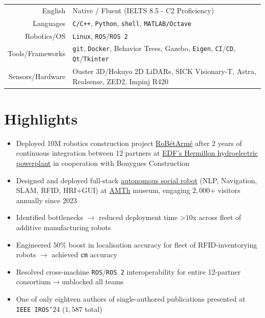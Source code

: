 \documentclass[a4paper,10pt,twoside]{article}
\begin{document}
\begin{center}
\begin{tabular}{rl}
English & Native / Fluent (IELTS 8.5 - C2 Proficiency) \\
Languages & \texttt{C/C++}, \texttt{Python}, \texttt{shell}, \texttt{MATLAB/Octave} \\
Robotics/OS & \texttt{Linux},  \texttt{ROS}/\texttt{ROS 2} \\
Tools/Frameworks & \texttt{git}, \texttt{Docker}, Behavior Trees, Gazebo, \texttt{Eigen}, \texttt{CI}/\texttt{CD}, \texttt{Qt}/\texttt{Tkinter} \\
Sensors/Hardware & {\small Ouster 3D/Hokuyo 2D LiDARs, SICK Visionary-T, Astra, Realsense, ZED2, Impinj R420 }%
\end{tabular}
\end{center}
\verticalspacebetweensections

\section{\textbf{Highlights}}\verticalspacebetweensectionandcontent
  \noindent\begin{minipage}[t]{\textwidth}
    \begin{itemize}
      \item Deployed \texteuro10M robotics construction project \href{https://www.robetarme-project.eu/sobre/}{RoBétArmé} after 2 years of continuous integration between 12 partners at \href{https://www.gem.wiki/Hermillon_hydroelectric_plant}{EDF's Hermillon hydroelectric powerplant} in cooperation with Bouygues Construction\verticalspaceafteritem
      \item Designed and deployed full-stack \href{https://www.youtube.com/watch?v=2EvTGNOqTrs}{autonomous social robot} (NLP, Navigation, SLAM, RFID, HRI+GUI) at \href{https://www.amth.gr/en}{AMTh} museum, engaging $2$$,$$000$+ visitors annually since $2023$\verticalspaceafteritem
      \item Identified bottlenecks $\rightarrow$ reduced deployment time >$10$x across fleet of additive manufacturing robots\verticalspaceafteritem
      \item Engineered $50\%$ boost in localisation accuracy for fleet of RFID-inventorying robots $\rightarrow$ achieved \texttt{cm} accuracy\verticalspaceafteritem
      \item Resolved cross-machine \texttt{ROS}/\texttt{ROS~2} interoperability for entire 12-partner consortium$\rightarrow$unblocked all teams\verticalspaceafteritem
      \item One of only eighteen authors of single-authored publications presented at \texttt{IEEE IROS'}$24$ ($1$$,$$587$ total)
    \end{itemize}
  \end{minipage} \\%
\verticalspacebetweensections
\end{document}
